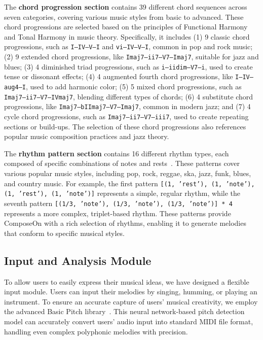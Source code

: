 The \textbf{chord progression section} contains 39 different chord sequences across seven categories, covering various music styles from basic to advanced. These chord progressions are selected based on the principles of Functional Harmony and Tonal Harmony in music theory\cite{kostka2008harmonia,clendinning2016musician}. Specifically, it includes (1) 9 classic chord progressions, such as \texttt{I–IV–V–I} and \texttt{vi–IV–V–I}, common in pop and rock music; (2) 9 extended chord progressions, like \texttt{Imaj7–ii7–V7–Imaj7}, suitable for jazz and blues; (3) 4 diminished triad progressions, such as \texttt{i–iidim–V7–i}, used to create tense or dissonant effects; (4) 4 augmented fourth chord progressions, like \texttt{I–IV–aug4–I}, used to add harmonic color; (5) 5 mixed chord progressions, such as \texttt{Imaj7–ii7–V7–IVmaj7}, blending different types of chords; (6) 4 substitute chord progressions, like \texttt{Imaj7–bIImaj7–V7–Imaj7}, common in modern jazz; and (7) 4 cycle chord progressions, such as \texttt{Imaj7–ii7–V7–iii7}, used to create repeating sections or build-ups. The selection of these chord progressions also references popular music composition practices and jazz theory\cite{levine2011jazz,mulholland2013berklee}.

The \textbf{rhythm pattern section} contains 16 different rhythm types, each composed of specific combinations of notes and rests~\cite{r9}. These patterns cover various popular music styles, including pop, rock, reggae, ska, jazz, funk, blues, and country music. For example, the first pattern \texttt{[(1, 'rest'), (1, 'note'), (1, 'rest'), (1, 'note')]} represents a simple, regular rhythm, while the seventh pattern \texttt{[(1/3, 'note'), (1/3, 'note'), (1/3, 'note')] * 4} represents a more complex, triplet-based rhythm. These patterns provide ComposeOn with a rich selection of rhythms, enabling it to generate melodies that conform to specific musical styles.

\subsection{Input and Analysis Module}

To allow users to easily express their musical ideas, we have designed a flexible input module. Users can input their melodies by singing, humming, or playing an instrument. To ensure an accurate capture of users' musical creativity, we employ the advanced Basic Pitch library~\cite{r10}. This neural network-based pitch detection model can accurately convert users' audio input into standard MIDI file format, handling even complex polyphonic melodies with precision.

